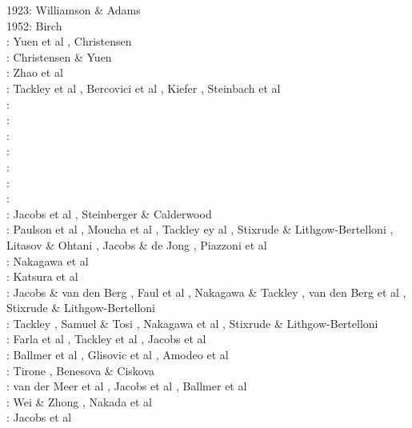 \begin{scriptsize}
1923: Williamson \& Adams \cite{wiad23}\\
1952: Birch \cite{birc52}\\
\nineteeneightytwo: Yuen et al \cite{yusb82}, Christensen \cite{chri82}\\
\nineteeneightyfive: Christensen \& Yuen \cite{chyu85}\\
\nineteenninetytwo: Zhao et al \cite{zhyh92}\\
\nineteenninetythree: Tackley et al \cite{tasg93}, Bercovici et al \cite{best93}, Kiefer \cite{kief93},
Steinbach et al \cite{styz93}\\
\nineteenninetyfour: \cite{vayv94}\cite{zhgu94b}\cite{styu94}\\
\nineteenninetyfive: \cite{zhyu95}\cite{chri95}\cite{scta95}\cite{tack95}\\
\nineteenninetysix: \cite{pelt96}\cite{mitr96}\cite{tack96b}\\
\nineteenninetyseven: \cite{mifo97}\cite{pebs97}\\
\nineteenninetyeight: \cite{cava98}\cite{kenn98}\\
\nineteenninetynine: \cite{sigh99}\cite{kehv99}\cite{vaka99}\\
\twothousandfive: \cite{hett05}\cite{nata05b}\cite{nabu05}\cite{stli05}\cite{stli05b}\\
\twothousandsix: Jacobs et al \cite{javd06}, Steinberger \& Calderwood \cite{stca06}\\
\twothousandseven: Paulson et al \cite{pazw07}, Moucha et al \cite{mofm07}, Tackley ey al \cite{tanh07}, 
Stixrude \& Lithgow-Bertelloni \cite{stli07}, Litasov \& Ohtani \cite{lioh07}, Jacobs \& de Jong \cite{jade07},
Piazzoni et al \cite{pisb07}\\
\twothousandnine: Nakagawa et al \cite{natd09}\\
\twothousandten: Katsura et al \cite{kayy10}\\
\twothousandeleven: Jacobs \& van den Berg \cite{java11}, Faul et al \cite{faff11}, Nakagawa \& Tackley \cite{nata11}, 
van den Berg et al \cite{vayj11}, Stixrude \& Lithgow-Bertelloni \cite{stli11}\\
\twothousandtwelve: Tackley \cite{tack12}, Samuel \& Tosi \cite{sato12}, Nakagawa et al \cite{natd12}, Stixrude \& Lithgow-Bertelloni \cite{stli12}\\
\twothousandthirteen: Farla et al \cite{fakc13}, Tackley et al \cite{taab13}, Jacobs et al \cite{jasv13}\\
\twothousandfifteen: Ballmer et al \cite{basn15}, Glisovic et al \cite{glfa15}, Amodeo et al \cite{amsb15}\\
\twothousandsixteen: Tirone \cite{tiro16}, Benesova \& Ciskova \cite{beci16}\\
\twothousandseventeen: van der Meer et al \cite{vavs17}, Jacobs et al \cite{jasv17}, Ballmer et al \cite{bahh17}\\
\twothousandeighteen: Wei \& Zhong \cite{mazh18}, Nakada et al \cite{naoi18}\\
\twothousandnineteen: Jacobs et al \cite{jasv19}
\end{scriptsize}


